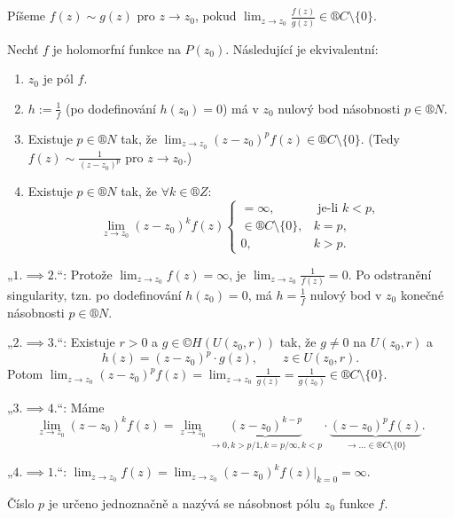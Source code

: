 \documentclass[12pt]{article}					%
\begin{document}
\begin{definice}
	\begin{poznamka}
		Píšeme $f(z)\sim g(z)$ pro $z \rightarrow z_0$, pokud $\lim_{z \rightarrow z_0} \frac{f(z)}{g(z)} \in ®C \setminus \{0\}$.
	\end{poznamka}

	\begin{veta}[O póle]
		Nechť $f$ je holomorfní funkce na $P(z_0)$. Následující je ekvivalentní:
		
		\begin{enumerate}
			\item $z_0$ je pól $f$.
			\item $h := \frac{1}{f}$ (po dodefinování $h(z_0) = 0$) má v $z_0$ nulový bod násobnosti $p \in ®N$.
			\item Existuje $p \in ®N$ tak, že $\lim_{z \rightarrow z_0}(z - z_0)^p f(z) \in ®C \setminus \{0\}$. (Tedy $f(z) \sim \frac{1}{(z - z_0)^p}$ pro $z \rightarrow z_0$.)
			\item Existuje $p \in ®N$ tak, že $\forall k \in ®Z$:
				$$ \lim_{z \rightarrow z_0} (z - z_0)^k f(z) \begin{cases} = ∞, & \text{ je-li } k < p,\\ \in ®C \setminus \{0\}, & k=p, \\ 0, & k > p.\end{cases} $$
		\end{enumerate}

		\begin{dukazin}
			„$1. \implies 2.$“: Protože $\lim_{z \rightarrow z_0} f(z) = ∞$, je $\lim_{z \rightarrow z_0} \frac{1}{f(z)} = 0$. Po odstranění singularity, tzn. po dodefinování $h(z_0) = 0$, má $h = \frac{1}{f}$ nulový bod v $z_0$ konečné násobnosti $p \in ®N$.

			„$2. \implies 3.$“: Existuje $r > 0$ a $g \in ©H(U(z_0, r))$ tak, že $g ≠ 0$ na $U(z_0, r)$ a
			$$ h(z) = (z - z_0)^p·g(z), \qquad z \in U(z_0, r). $$
			Potom $\lim_{z \rightarrow z_0} (z - z_0)^p f(z) = \lim_{z \rightarrow z_0} \frac{1}{g(z)} = \frac{1}{g(z_0)} \in ®C \setminus \{0\}$.

			„$3. \implies 4.$“: Máme
			$$ \lim_{z \rightarrow z_0} (z - z_0)^k f(z) = \lim_{z \rightarrow z_0} \underbrace{(z - z_0)^{k - p}}_{\rightarrow 0, k > p / 1, k=p / ∞, k < p}·\underbrace{(z - z_0)^p f(z)}_{\rightarrow … \in ®C \setminus \{0\}}. $$

			„$4. \implies 1.$“: $\lim_{z \rightarrow z_0} f(z) = \lim_{z \rightarrow z_0} (z - z_0)^k f(z) |_{k=0} = ∞$.
		\end{dukazin}
	\end{veta}

	\begin{definice}
		Číslo $p$ je určeno jednoznačně a nazývá se násobnost pólu $z_0$ funkce $f$.	
	\end{definice}
\end{definice}
\end{document}
